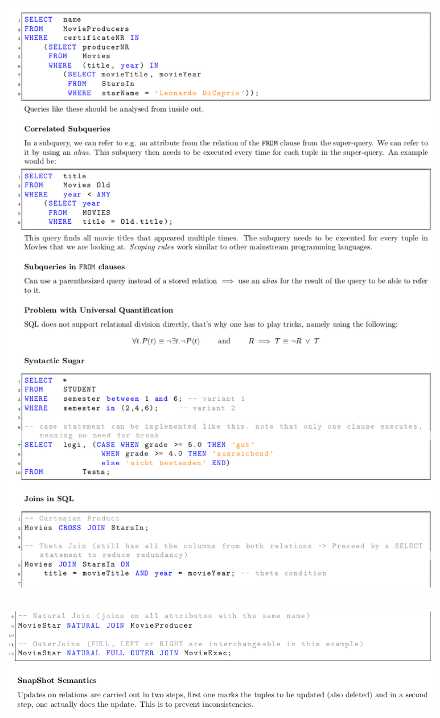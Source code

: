 \documentclass[11pt,oneside,a4paper]{article}
\begin{document}
\vspace{-\topsep}
\begin{figure}[hb!]
	\centering
	\includegraphics[width=1\linewidth]{figures/sql_10}
	\label{fig:sql10}
\end{figure}
\vspace{-\topsep}

\newpage

\vspace{-\topsep}
\begin{figure}[hb!]
	\centering
	\includegraphics[width=1\linewidth]{figures/sql_11}
	\label{fig:sql11}
\end{figure}
\vspace{-\topsep}
\end{document}
